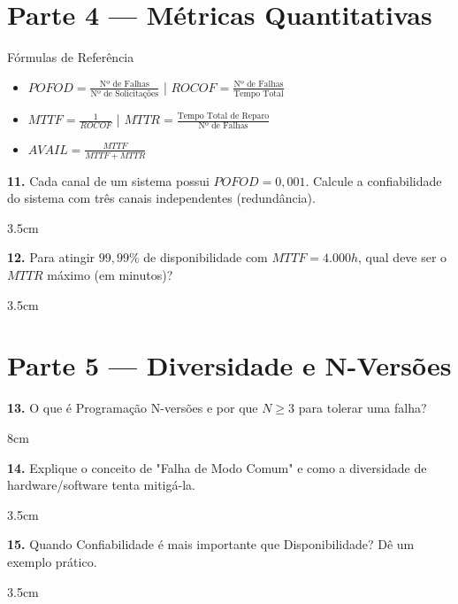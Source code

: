 \documentclass[12pt,a4paper]{report}
\begin{document}
\newpage

\section*{Parte 4 — Métricas Quantitativas}

\begin{block}{Fórmulas de Referência}
    \small
    \begin{itemize}
        \item $POFOD = \frac{\text{Nº de Falhas}}{\text{Nº de Solicitações}}$ \quad | \quad $ROCOF = \frac{\text{Nº de Falhas}}{\text{Tempo Total}}$
        \item $MTTF = \frac{1}{ROCOF}$ \quad | \quad $MTTR = \frac{\text{Tempo Total de Reparo}}{\text{Nº de Falhas}}$
        \item $AVAIL = \frac{MTTF}{MTTF + MTTR}$
    \end{itemize}
\end{block}

\textbf{11.} Cada canal de um sistema possui $POFOD = 0,001$. Calcule a confiabilidade do sistema com três canais independentes (redundância).
\begin{resposta}{3.5cm}
\end{resposta}

\textbf{12.} Para atingir $99,99\%$ de disponibilidade com $MTTF = 4.000h$, qual deve ser o $MTTR$ máximo (em minutos)?
\begin{resposta}{3.5cm}
\end{resposta}

\section*{Parte 5 — Diversidade e N-Versões}

\textbf{13.} O que é Programação N-versões e por que $N \ge 3$ para tolerar uma falha?
\begin{resposta}{8cm}
\end{resposta}

\textbf{14.} Explique o conceito de "Falha de Modo Comum" e como a diversidade de hardware/software tenta mitigá-la.
\begin{resposta}{3.5cm}
\end{resposta}

\textbf{15.} Quando Confiabilidade é mais importante que Disponibilidade? Dê um exemplo prático.
\begin{resposta}{3.5cm}
\end{resposta}
\end{document}
